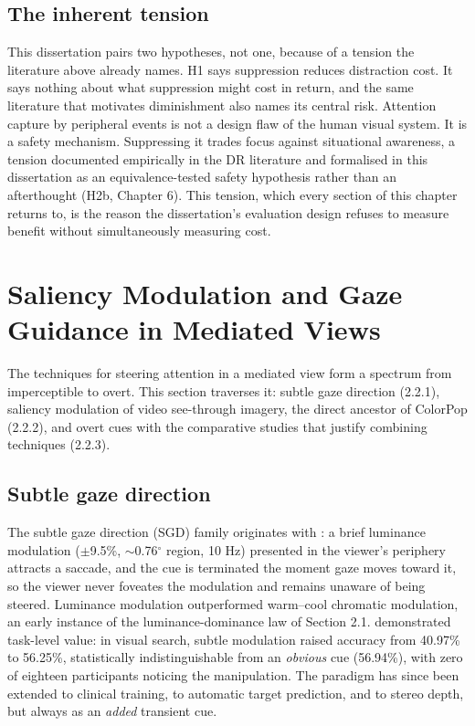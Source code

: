 \subsection{The inherent tension}

This dissertation pairs two hypotheses, not one, because of a tension the literature above already
names. H1 says suppression reduces distraction cost. It says nothing about what suppression might
cost in return, and the same literature that motivates diminishment also names its central risk.
Attention capture by
peripheral events is not a design flaw of the human visual system. It is a safety mechanism.
Suppressing it trades focus against situational awareness, a tension documented empirically in the
DR literature \citep{murph2021,mclaughlin2025} and formalised in this
dissertation as an equivalence-tested safety hypothesis rather than an afterthought (H2b, Chapter 6).
This tension, which every section of this chapter returns to, is the reason the dissertation's
evaluation design refuses to measure benefit without simultaneously measuring cost.

\section{Saliency Modulation and Gaze Guidance in Mediated Views}

The techniques for steering attention in a mediated view form a spectrum from imperceptible to overt.
This section traverses it: subtle gaze direction (2.2.1), saliency modulation of video see-through
imagery, the direct ancestor of ColorPop (2.2.2), and overt cues with the comparative studies that
justify combining techniques (2.2.3).

\subsection{Subtle gaze direction}

The subtle gaze direction (SGD) family originates with \citet{bailey2009}:
a brief luminance modulation ($\pm$9.5\%, $\sim$0.76$^{\circ}$ region, 10 Hz) presented in the viewer's periphery
attracts a saccade, and the cue is terminated the moment gaze moves toward it, so the viewer never
foveates the modulation and remains unaware of being steered. Luminance modulation outperformed
warm–cool chromatic modulation, an early instance of the luminance-dominance law of Section 2.1.
\citet{mcnamara2008} demonstrated task-level value: in visual search, subtle modulation
raised accuracy from 40.97\% to 56.25\%, statistically indistinguishable from an \textit{obvious} cue
(56.94\%), with zero of eighteen participants noticing the manipulation. The paradigm has since been
extended to clinical training, to automatic target prediction, and to stereo depth, but always as an
\textit{added} transient cue.

